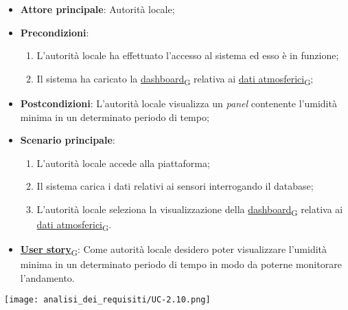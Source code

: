 \begin{itemize}
	\item \textbf{Attore principale}: Autorità locale;
	\item \textbf{Precondizioni}:
	      \begin{enumerate}
		      \item L'autorità locale ha effettuato l'accesso al sistema ed esso è in funzione;
		      \item Il sistema ha caricato la \href{https://7last.github.io/docs/rtb/documentazione-interna/glossario\#dashboard}{dashboard\textsubscript{G}} relativa ai \href{https://7last.github.io/docs/rtb/documentazione-interna/glossario\#dati-atmosferici}{dati atmosferici\textsubscript{G}};
	      \end{enumerate}
	\item \textbf{Postcondizioni}: L'autorità locale visualizza un \textit{panel} contenente l'umidità minima in un determinato periodo di tempo;
	\item \textbf{Scenario principale}:
	      \begin{enumerate}
		      \item L'autorità locale accede alla piattaforma;
		      \item Il sistema carica i dati relativi ai sensori interrogando il database;
		      \item L'autorità locale seleziona la visualizzazione della \href{https://7last.github.io/docs/rtb/documentazione-interna/glossario\#dashboard}{dashboard\textsubscript{G}} relativa ai \href{https://7last.github.io/docs/rtb/documentazione-interna/glossario\#dati-atmosferici}{dati atmosferici\textsubscript{G}}.
	      \end{enumerate}
	\item \href{https://7last.github.io/docs/rtb/documentazione-interna/glossario\#user-story}{\textbf{User story}\textsubscript{G}}: Come autorità locale desidero poter visualizzare l'umidità minima in un determinato periodo di tempo
	      in modo da poterne monitorare l'andamento.
\end{itemize}

\begin{center}
	\texttt{[image: analisi\_dei\_requisiti/UC-2.10.png]}
\end{center}


